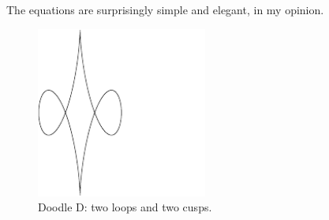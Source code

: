 \documentclass[onecolumn]{article}
\begin{document}
The equations are surprisingly simple and elegant, in my opinion.

\begin{figure}[H]
\caption{Doodle D: two loops and two cusps.}
\label{doodle_c}
\begin{center}
\includegraphics[width=0.5\textwidth]{doodle_d.pdf}
\end{center}
\end{figure}
\end{document}
